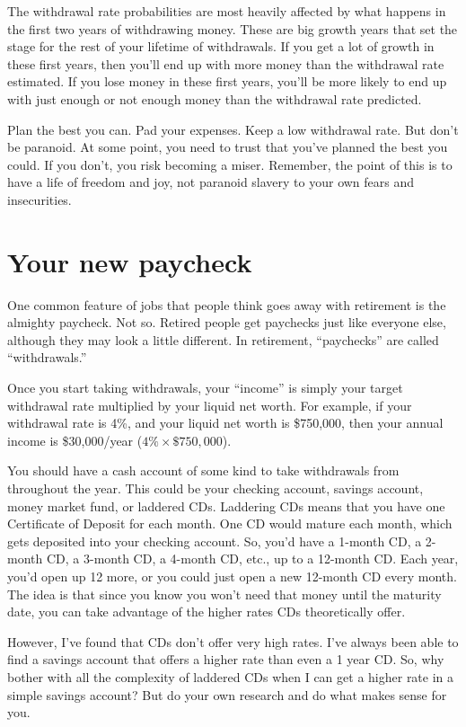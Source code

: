 The withdrawal rate probabilities are most heavily affected by what happens in the first two years of withdrawing money. These are big growth years that set the stage for the rest of your lifetime of withdrawals. If you get a lot of growth in these first years, then you'll end up with more money than the withdrawal rate estimated. If you lose money in these first years, you'll be more likely to end up with just enough or not enough money than the withdrawal rate predicted.

Plan the best you can. Pad your expenses. Keep a low withdrawal rate. But don't be paranoid. At some point, you need to trust that you've planned the best you could. If you don't, you risk becoming a miser. Remember, the point of this is to have a life of freedom and joy, not paranoid slavery to your own fears and insecurities.

\section{Your new paycheck}
One common feature of jobs that people think goes away with retirement is the almighty paycheck. Not so. Retired people get paychecks just like everyone else, although they may look a little different. In retirement, ``paychecks'' are called ``withdrawals.''

Once you start taking withdrawals, your ``income'' is simply your target withdrawal rate multiplied by your liquid net worth. For example, if your withdrawal rate is 4\%, and your liquid net worth is \$750,000, then your annual income is \$30,000/year ($4\% \times \$750,000$).

You should have a cash account of some kind to take withdrawals from throughout the year. This could be your checking account, savings account, money market fund, or laddered CDs. Laddering CDs means that you have one Certificate of Deposit for each month. One CD would mature each month, which gets deposited into your checking account. So, you'd have a 1-month CD, a 2-month CD, a 3-month CD, a 4-month CD, etc., up to a 12-month CD. Each year, you'd open up 12 more, or you could just open a new 12-month CD every month. The idea is that since you know you won't need that money until the maturity date, you can take advantage of the higher rates CDs theoretically offer.

However, I've found that CDs don't offer very high rates. I've always been able to find a savings account that offers a higher rate than even a 1 year CD. So, why bother with all the complexity of laddered CDs when I can get a higher rate in a simple savings account? But do your own research and do what makes sense for you.

